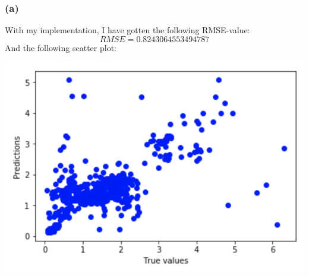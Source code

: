 \documentclass{report}
\begin{document}
\subsubsection*{(a)}
With my implementation, I have gotten the following RMSE-value:
$$RMSE = 0.8243064553494787$$
And the following scatter plot:
\begin{center}
    \includegraphics[height = 7 cm]{kNN_Scatter_a}
\end{center}
\end{document}
